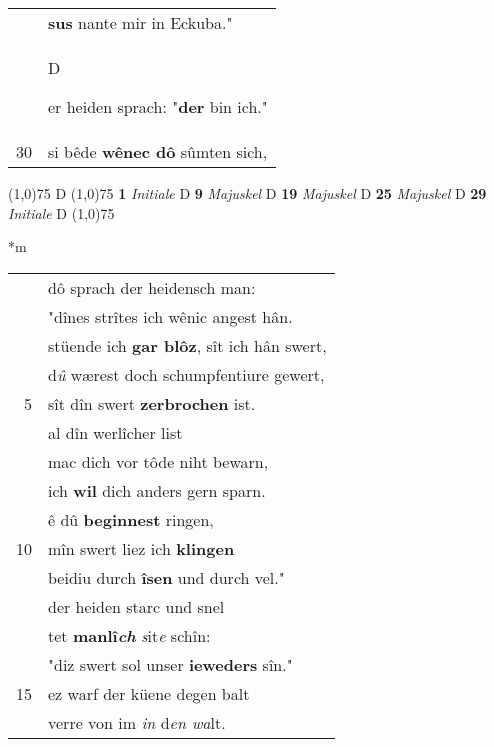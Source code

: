 \documentclass[8pt,a4paper,notitlepage]{article}
\begin{document}
\begin{table}[ht]
\begin{minipage}[t]{0.5\linewidth}
\begin{tabular}{rl}
 & \textbf{sus} nante mir in Eckuba."\\ 
 & \begin{large}D\end{large}er heiden sprach: "\textbf{der} bin ich."\\ 
30 & si bêde \textbf{wênec dô} sûmten sich,\\ 
\end{tabular}
\scriptsize
\line(1,0){75} \newline
D \newline
\line(1,0){75} \newline
\textbf{1} \textit{Initiale} D  \textbf{9} \textit{Majuskel} D  \textbf{19} \textit{Majuskel} D  \textbf{25} \textit{Majuskel} D  \textbf{29} \textit{Initiale} D  \newline
\line(1,0){75} \newline
\newline
\end{minipage}
\hspace{0.5cm}
\begin{minipage}[t]{0.5\linewidth}
\small
\begin{center}*m
\end{center}
\begin{tabular}{rl}
 & dô sprach der heidensch man:\\ 
 & "dînes strîtes ich wênic angest hân.\\ 
 & stüende ich \textbf{gar blôz}, sît ich hân swert,\\ 
 & d\textit{û} wærest doch schumpfentiure gewert,\\ 
5 & sît dîn swert \textbf{zerbrochen} ist.\\ 
 & al dîn werlîcher list\\ 
 & mac dich vor tôde niht bewarn,\\ 
 & ich \textbf{wil} dich anders gern sparn.\\ 
 & ê dû \textbf{beginnest} ringen,\\ 
10 & mîn swert liez ich \textbf{klingen}\\ 
 & beidiu durch \textbf{îsen} und durch vel."\\ 
 & der heiden starc und snel\\ 
 & tet \textbf{manlî\textit{ch}} \textit{s}it\textit{e} schîn:\\ 
 & "diz swert sol unser \textbf{ieweders} sîn."\\ 
15 & ez warf der küene degen balt\\ 
 & verre von im \textit{in} d\textit{en wa}lt.\\ 

\end{tabular}
\end{minipage}
\end{table}
\end{document}
